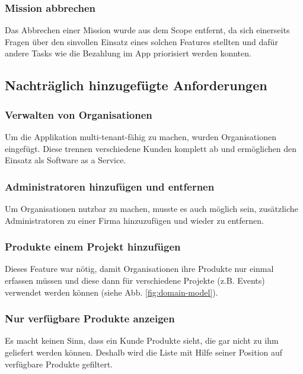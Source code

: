 \subsubsection{Mission abbrechen}

Das Abbrechen einer Mission wurde aus dem Scope entfernt, da sich einerseits Fragen über den sinvollen Einsatz eines solchen Features stellten und dafür andere Tasks wie die Bezahlung im App priorisiert werden konnten.

\subsection{Nachträglich hinzugefügte Anforderungen}

\subsubsection{Verwalten von Organisationen}

Um die Applikation multi-tenant-fähig zu machen, wurden Organisationen eingefügt. Diese trennen verschiedene Kunden komplett ab und ermöglichen den Einsatz als Software as a Service.

\subsubsection{Administratoren hinzufügen und entfernen}

Um Organisationen nutzbar zu machen, musste es auch möglich sein, zusätzliche Administratoren zu einer Firma hinzuzufügen und wieder zu entfernen.

\subsubsection{Produkte einem Projekt hinzufügen}

Dieses Feature war nötig, damit Organisationen ihre Produkte nur einmal erfassen müssen und diese dann für verschiedene Projekte (z.B. Events) verwendet werden können (siehe Abb. \ref{fig:domain-model}).

\subsubsection{Nur verfügbare Produkte anzeigen}

Es macht keinen Sinn, dass ein Kunde Produkte sieht, die gar nicht zu ihm geliefert werden können. Deshalb wird die Liste mit Hilfe seiner Position auf verfügbare Produkte gefiltert.


